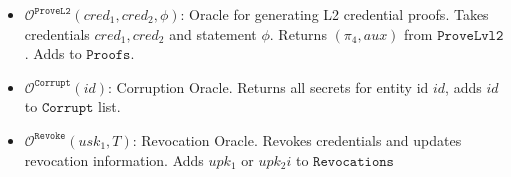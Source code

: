 \begin{itemize}
    \item $\mathcal{O}^{\texttt{ProveL2}}(cred_1, cred_2, \phi)$: Oracle for generating L2 credential proofs. Takes credentials $cred_1, cred_2$ and statement $\phi$. Returns $(\pi_4, aux)$ from $\texttt{ProveLvl2}$. Adds to $\texttt{Proofs}$.

    \item $\mathcal{O}^{\texttt{Corrupt}}(id)$: Corruption Oracle. Returns all secrets for entity id $id$, adds $id$ to $\texttt{Corrupt}$ list.

    \item $\mathcal{O}^{\texttt{Revoke}}(usk_1, T)$: Revocation Oracle. Revokes credentials and updates revocation information. Adds $upk_1$ or $upk_2i$ to $\texttt{Revocations}$
    
\end{itemize}
